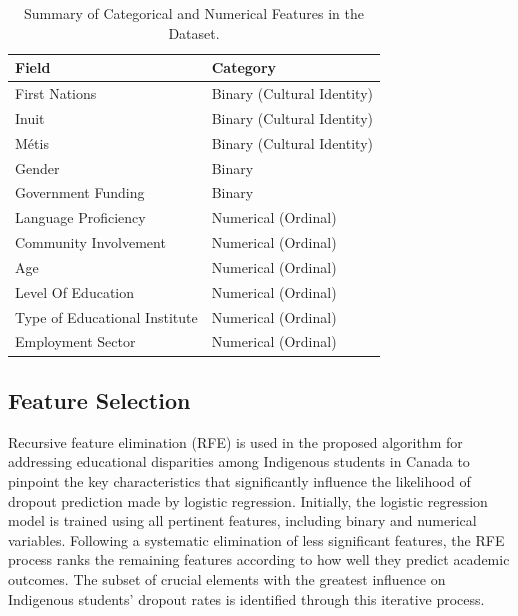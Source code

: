 \documentclass[a4paper,twoside]{article}
\begin{document}
\begin{table}[htbp]
    \caption{Summary of Categorical and Numerical Features in the Dataset.}
    \label{tab:example2}
    \small %
    \begin{tabularx}{\columnwidth}{|X|X|}
        \hline
        {Field} & {Category} \\
        \hline
        First Nations & Binary (Cultural Identity) \\
        \hline
        Inuit & Binary (Cultural Identity) \\
        \hline
        Métis & Binary (Cultural Identity) \\
        \hline
        Gender & Binary \\
        \hline
        Government Funding & Binary \\
        \hline
        Language Proficiency & Numerical (Ordinal) \\
        \hline
        Community Involvement & Numerical (Ordinal) \\
        \hline
        Age & Numerical (Ordinal) \\
        \hline
        Level Of Education & Numerical (Ordinal) \\
        \hline
        Type of Educational Institute & Numerical (Ordinal) \\
        \hline
        Employment Sector & Numerical (Ordinal) \\
        \hline
    \end{tabularx}
\end{table}


\subsection{Feature Selection}
Recursive feature elimination (RFE) \cite{Mishra20} is used in the proposed algorithm
for addressing educational disparities among Indigenous students in Canada
to pinpoint the key characteristics that significantly influence the likelihood of dropout prediction made by logistic regression. Initially, the logistic regression model is trained using all pertinent features, including binary and numerical variables. Following a systematic elimination of less significant features, the RFE process ranks the remaining features according to how well they predict academic outcomes. The subset of crucial elements with the greatest influence on Indigenous students’ dropout rates is identified through this iterative process.
\end{document}
